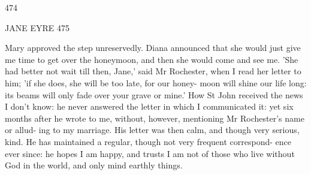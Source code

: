 \documentclass[11pt,twoside]{article}\makeatletter
\begin{document}
\begin{shaded}
                            474

                 JANE EYRE                      475

Mary approved the step unreservedly. Diana announced that she
would just give me time to get over the honeymoon, and then she
would come and see me.
   'She had better not wait till then, Jane,' said Mr Rochester, when I
read her letter to him; 'if she does, she will be too late, for our honey-
moon will shine our life long: its beams will only fade over your
grave or mine.'
   How St John received the news I don't know: he never answered
the letter in which I communicated it: yet six months after he wrote
to me, without, however, mentioning Mr Rochester's name or allud-
ing to my marriage. His letter was then calm, and though very serious,
kind. He has maintained a regular, though not very frequent correspond-
ence ever since: he hopes I am happy, and trusts I am not of those who
live without God in the world, and only mind earthly
things.\end{shaded}
\par\egroup 
\end{document}
